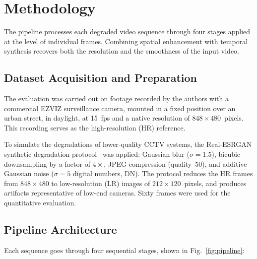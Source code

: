 \documentclass[conference]{IEEEtran}
\begin{document}
\section{Methodology}

The pipeline processes each degraded video sequence through four stages applied at the level of individual frames. Combining spatial enhancement with temporal synthesis recovers both the resolution and the smoothness of the input video.

\subsection{Dataset Acquisition and Preparation}
\label{sec:dataset}

The evaluation was carried out on footage recorded by the authors with a commercial EZVIZ surveillance camera, mounted in a fixed position over an urban street, in daylight, at 15~fps and a native resolution of $848\times480$~pixels. This recording serves as the high-resolution (HR) reference.

To simulate the degradations of lower-quality CCTV systems, the Real-ESRGAN synthetic degradation protocol~\cite{wang2021realesrgan} was applied: Gaussian blur ($\sigma=1.5$), bicubic downsampling by a factor of $4\times$, JPEG compression (quality~50), and additive Gaussian noise ($\sigma=5$ digital numbers, DN). The protocol reduces the HR frames from $848\times480$ to low-resolution (LR) images of $212\times120$~pixels, and produces artifacts representative of low-end cameras. Sixty frames were used for the quantitative evaluation.

\subsection{Pipeline Architecture}

Each sequence goes through four sequential stages, shown in Fig.~\ref{fig:pipeline}:
\end{document}
